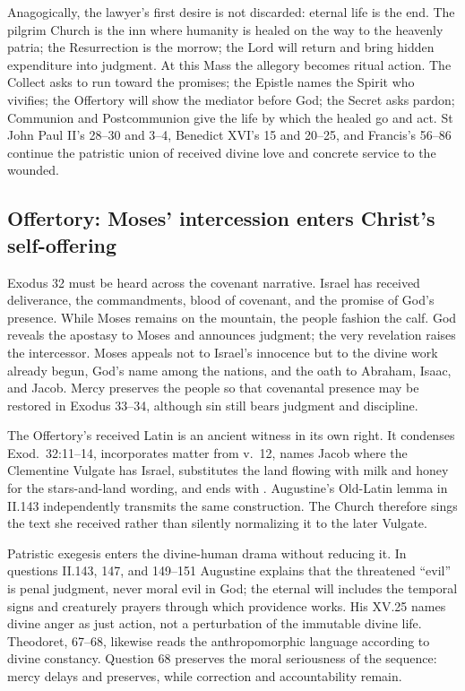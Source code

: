 Anagogically, the lawyer's first desire is not discarded: eternal life is the
end. The pilgrim Church is the inn where humanity is healed on the way to the
heavenly patria; the Resurrection is the morrow; the Lord will return and
bring hidden expenditure into judgment. At this Mass the allegory becomes
ritual action. The Collect asks to run toward the promises; the Epistle names
the Spirit who vivifies; the Offertory will show the mediator before God; the
Secret asks pardon; Communion and Postcommunion give the life by which the
healed go and act. St John Paul II's  28--30 and
 3--4, Benedict XVI's 
15 and 20--25, and Francis's  56--86 continue the
patristic union of received divine love and concrete service to the wounded.

\elementguard
\subsection*{Offertory: Moses' intercession enters Christ's self-offering }

Exodus 32 must be heard across the covenant narrative. Israel has received
deliverance, the commandments, blood of covenant, and the promise of God's
presence. While Moses remains on the mountain, the people fashion the calf.
God reveals the apostasy to Moses and announces judgment; the very revelation
raises the intercessor. Moses appeals not to Israel's innocence but to the
divine work already begun, God's name among the nations, and the oath to
Abraham, Isaac, and Jacob. Mercy preserves the people so that covenantal
presence may be restored in Exodus 33--34, although sin still bears judgment
and discipline.

The Offertory's received Latin is an ancient witness in its own right. It
condenses Exod.~32:11--14, incorporates matter from v.~12, names Jacob where
the Clementine Vulgate has Israel, substitutes the land flowing with milk and
honey for the stars-and-land wording, and ends with
. Augustine's Old-Latin lemma in 
II.143 independently transmits the same construction. The Church therefore
sings the text she received rather than silently normalizing it to the later
Vulgate.

Patristic exegesis enters the divine-human drama without reducing it. In
questions II.143, 147, and 149--151 Augustine explains that the threatened
``evil'' is penal judgment, never moral evil in God; the eternal will includes
the temporal signs and creaturely prayers through which providence works. His
 XV.25 names divine anger as just action, not a perturbation
of the immutable divine life. Theodoret,  67--68,
likewise reads the anthropomorphic language according to divine constancy.
Question 68 preserves the moral seriousness of the sequence: mercy delays and
preserves, while correction and accountability remain.

